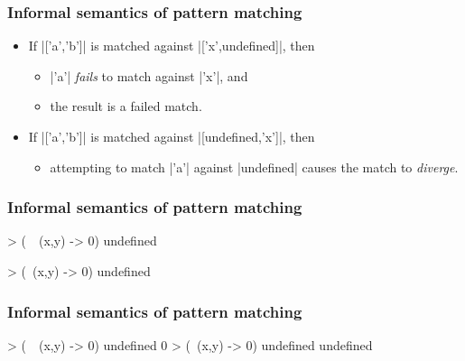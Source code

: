 \documentclass{beamer}
\begin{document}

\begin{frame}[fragile]
  \frametitle{Informal semantics of pattern matching}

  \begin{examples}
    \begin{itemize}
    \item<1->
      If |['a','b']| is matched against |['x',undefined]|, then
      \begin{itemize}
      \item<2->
        |'a'| \emph{fails} to match against |'x'|, and
      \item<2->
        the result is a failed match.
      \end{itemize}
    \item<1->
      If |['a','b']| is matched against |[undefined,'x']|, then
      \begin{itemize}
      \item<2->
        attempting to match |'a'| against |undefined| causes the match
        to \emph{diverge}.
      \end{itemize}
    \end{itemize}
  \end{examples}
\end{frame}


\begin{frame}[fragile]
  \frametitle{Informal semantics of pattern matching}

  \begin{example}
    \begin{code}
> (\ ~(x,y) -> 0) undefined

> (\  (x,y) -> 0) undefined

    \end{code}
  \end{example}
\end{frame}

\begin{frame}[fragile]
  \frametitle{Informal semantics of pattern matching}

  \begin{example}
    \begin{code}
> (\ ~(x,y) -> 0) undefined
0
> (\  (x,y) -> 0) undefined
undefined
    \end{code}
  \end{example}
\end{frame}
\end{document}
